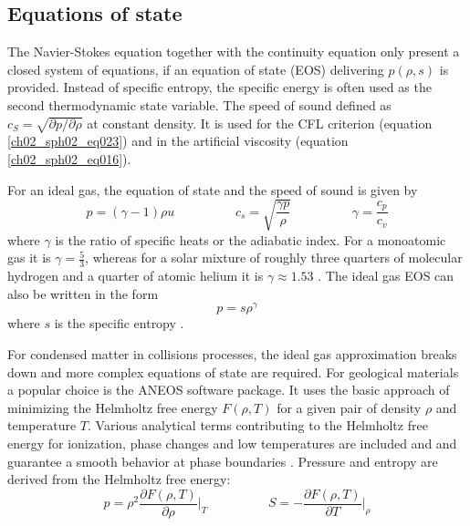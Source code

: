 \subsection{Equations of state}
The Navier-Stokes equation together with the continuity equation only present a closed system of equations, if an equation of state (EOS) delivering $p(\rho, s)$ is provided. Instead of specific entropy, the specific energy is often used as the second thermodynamic state variable. The speed of sound defined as $c_S = \sqrt{ \partial p / \partial \rho }$ at constant density. It is used for the CFL criterion (equation \ref{ch02_sph02_eq023}) and in the artificial viscosity (equation \ref{ch02_sph02_eq016}).

For an ideal gas, the equation of state and the speed of sound is given by
\begin{equation}
\label{ch02_sph01_eq036}
p = ( \gamma - 1 ) \rho u \hspace{2cm} c_s = \sqrt{ \frac{\gamma p}{\rho} } \hspace{2cm} \gamma = \frac{c_p}{c_v}
\end{equation}
where $\gamma$ is the ratio of specific heats or the adiabatic index. For a monoatomic gas it is $\gamma = \frac{5}{3}$, whereas for a solar mixture of roughly three quarters of molecular hydrogen and a quarter of atomic helium it is $\gamma \approx 1.53$ \citep{Nelson:2000p75}. The ideal gas EOS can also be written in the form 
\begin{equation}
p = s \rho^{\gamma}
\end{equation}
where $s$ is the specific entropy \citep{Springel:2005p51}.

For condensed matter in collisions processes, the ideal gas approximation breaks down and more complex equations of state are required. For geological materials a popular choice is the ANEOS software package. It uses the basic approach of minimizing the Helmholtz free energy $F(\rho, T)$ for a given pair of density $\rho$ and temperature $T$. Various analytical terms contributing to the Helmholtz free energy for ionization, phase changes and low temperatures are included and and guarantee a smooth behavior at phase boundaries \citep{Thompson:1990p1103}. Pressure and entropy are derived from the Helmholtz free energy:
\begin{equation}
\label{ch02_sph01_eq037}
p = \rho^2 \frac{\partial F(\rho, T)}{\partial \rho} \Big|_{T} \hspace{2cm} S = - \frac{\partial F(\rho, T)}{\partial T} \Big|_{\rho}
\end{equation}


